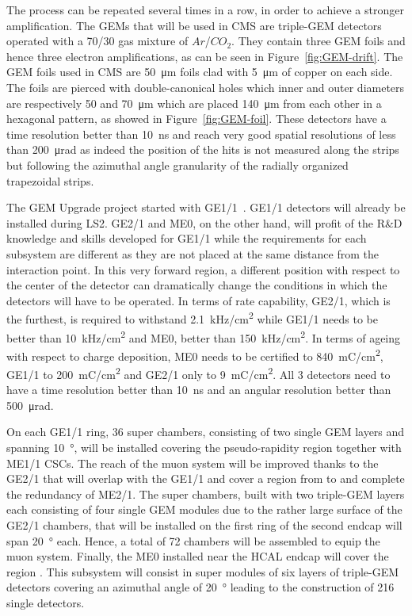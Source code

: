 	The process can be repeated several times in a row, in order to achieve a stronger amplification. The GEMs that will be used in CMS are triple-GEM detectors operated with a 70/30 gas mixture of $Ar$/$CO_2$. They contain three GEM foils and hence three electron amplifications, as can be seen in Figure~\ref{fig:GEM-drift}. The GEM foils used in CMS are \SI{50}{\micro m} foils clad with \SI{5}{\micro m} of copper on each side. The foils are pierced with double-canonical holes which inner and outer diameters are respectively 50 and \SI{70}{\micro m} which are placed \SI{140}{\micro m} from each other in a hexagonal pattern, as showed in Figure~\ref{fig:GEM-foil}. These detectors have a time resolution better than \SI{10}{ns} and reach very good spatial resolutions of less than \SI{200}{\micro rad} as indeed the position of the hits is not measured along the strips but following the azimuthal angle granularity of the radially organized trapezoidal strips.
	
\endgroup
	
	The GEM Upgrade project started with GE1/1~\cite{GEM11TDR}. GE1/1 detectors will already be installed during LS2. GE2/1 and ME0, on the other hand, will profit of the R\&D knowledge and skills developed for GE1/1 while the requirements for each subsystem are different as they are not placed at the same distance from the interaction point. In this very forward region, a different position with respect to the center of the detector can dramatically change the conditions in which the detectors will have to be operated. In terms of rate capability, GE2/1, which is the furthest, is required to withstand \SI{2.1}{kHz/cm^2} while GE1/1 needs to be better than \SI{10}{kHz/cm^2} and ME0, better than \SI{150}{kHz/cm^2}. In terms of ageing with respect to charge deposition, ME0 needs to be certified to \SI{840}{mC/cm^2}, GE1/1 to \SI{200}{mC/cm^2} and GE2/1 only to \SI{9}{mC/cm^2}. All 3 detectors need to have a time resolution better than \SI{10}{ns} and an angular resolution better than \SI{500}{\micro rad}.
	
	On each GE1/1 ring, 36 super chambers, consisting of two single GEM layers and spanning \SI{10}{\degree}, will be installed covering the pseudo-rapidity region  together with ME1/1 CSCs. The reach of the muon system will be improved thanks to the GE2/1 that will overlap with the GE1/1 and cover a region from  to  and complete the redundancy of ME2/1. The super chambers, built with two triple-GEM layers each consisting of four single GEM modules due to the rather large surface of the GE2/1 chambers, that will be installed on the first ring of the second endcap will span \SI{20}{\degree} each. Hence, a total of 72 chambers will be assembled to equip the muon system. Finally, the ME0 installed near the HCAL endcap will cover the region . This subsystem will consist in super modules of six layers of triple-GEM detectors covering an azimuthal angle of \SI{20}{\degree} leading to the construction of 216 single detectors.
	
